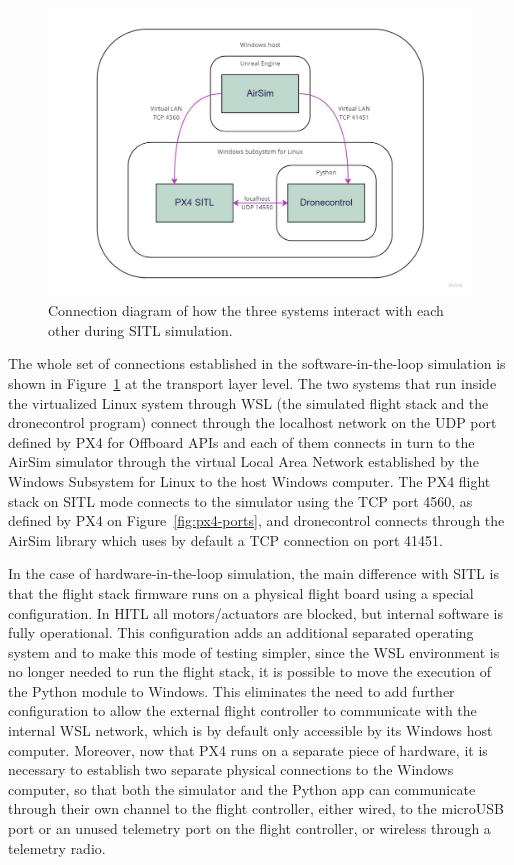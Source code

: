 \begin{figure}
  \centering
  \includegraphics[width=\textwidth,keepaspectratio]{img/sitl-connections.jpg}
  \caption{Connection diagram of how the three systems interact with each other during SITL simulation.}\label{fig:sitl-connections}
\end{figure}
The whole set of connections established in the software-in-the-loop simulation is shown in Figure~\ref{fig:sitl-connections} at the transport layer level. The two systems that run inside the virtualized Linux system through WSL (the simulated flight stack and the dronecontrol program) connect through the localhost network on the UDP port defined by PX4 for Offboard APIs and each of them connects in turn to the AirSim simulator through the virtual Local Area Network established by the Windows Subsystem for Linux to the host Windows computer.
The PX4 flight stack on SITL mode connects to the simulator using the TCP port 4560, as defined by PX4 on Figure~\ref{fig:px4-ports}, and dronecontrol connects through the AirSim library which uses by default a TCP connection on port 41451.

In the case of hardware-in-the-loop simulation, the main difference with SITL is that the flight stack firmware runs on a physical flight board using a special configuration.
In HITL all motors/actuators are blocked, but internal software is fully operational.
This configuration adds an additional separated operating system and to make this mode of testing simpler, since the WSL environment is no longer needed to run the flight stack, it is possible to move the execution of the Python module to Windows.
This eliminates the need to add further configuration to allow the external flight controller to communicate with the internal WSL network, which is by default only accessible by its Windows host computer.
Moreover, now that PX4 runs on a separate piece of hardware, it is necessary to establish two separate physical connections to the Windows computer, so that both the simulator and the Python app can communicate through their own channel to the flight controller, either wired, to the microUSB port or an unused telemetry port on the flight controller, or wireless through a telemetry radio.

